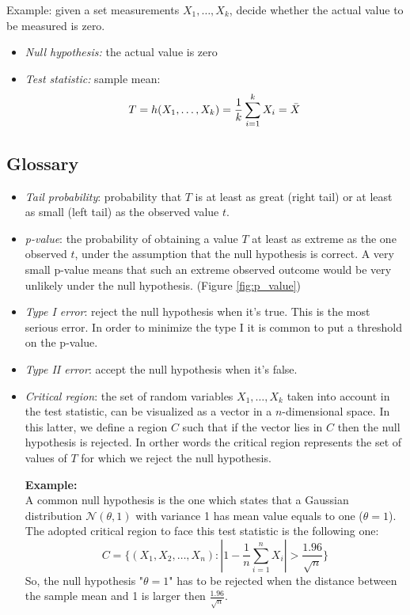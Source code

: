 Example: given a set measurements $X_1, \hdots, X_k$, decide whether the actual value to be measured is zero.
\begin{itemize}
    \item \textit{Null hypothesis:} the actual value is zero
    \item \textit{Test statistic:} sample mean:
    $$T = h(X_1, \hdots , X_k) = \frac{1}{k} \sum_{i=1}^k X_i = \Bar{X}$$
\end{itemize}

\subsection{Glossary}
\begin{itemize}
    \item \textit{Tail probability}: probability that $T$ is at least as great (right tail) or at least as small (left tail) as the observed value $t$.
    
    \item \textit{p-value}: the probability of obtaining a value $T$ at least as extreme as the one observed $t$, under the assumption that the null hypothesis is correct. A very small p-value means that such an extreme observed outcome would be very unlikely under the null hypothesis. (Figure \ref{fig:p_value})
    
    \item \textit{Type I error}: reject the null hypothesis when it's true. This is the most serious error. In order to minimize the type I it is common to put a threshold on the p-value.
    
    \item \textit{Type II error}: accept the null hypothesis when it's false.
    
    \item \textit{Critical region}: the set of random variables $X_1, \hdots, X_k$ taken into account in the test statistic, can be visualized as a vector in a $n$-dimensional space. In this latter, we define a region $C$ such that if the vector lies in $C$ then the null hypothesis is rejected. In orther words the critical region represents the set of values of $T$ for which we reject the null hypothesis. \newline
    
    \textbf{Example:}\\
    A common null hypothesis is the one which states that a Gaussian distribution $\mathcal{N}(\theta, 1)$ with variance 1 has mean value equals to one ($\theta = 1$). The adopted critical region to face this test statistic is the following one:
    $$C = \{(X_1, X_2, \hdots, X_n) : |1 - \frac{1}{n} \sum_{i=1}^n X_i| > \frac{1.96}{\sqrt{n}}\}$$
    So, the null hypothesis "$\theta = 1$" has to be rejected when the distance between the sample mean and 1 is larger then $\frac{1.96}{\sqrt{n}}$.
    

\end{itemize}

